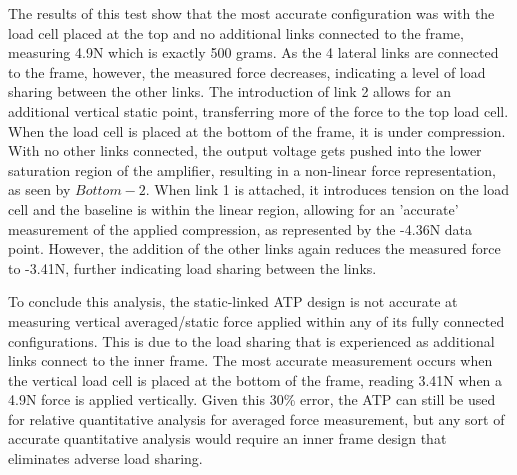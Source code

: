 The results of this test show that the most accurate configuration was with the load cell placed at the top and no additional links connected to the frame, measuring 4.9N which is exactly 500 grams. As the 4 lateral links are connected to the frame, however, the measured force decreases, indicating a level of load sharing between the other links. The introduction of link 2 allows for an additional vertical static point, transferring more of the force to the top load cell. When the load cell is placed at the bottom of the frame, it is under compression. With no other links connected, the output voltage gets pushed into the lower saturation region of the amplifier, resulting in a non-linear force representation, as seen by $Bottom-2$. When link 1 is attached, it introduces tension on the load cell and the baseline is within the linear region, allowing for an 'accurate' measurement of the applied compression, as represented by the -4.36N data point. However, the addition of the other links again reduces the measured force to -3.41N, further indicating load sharing between the links.

To conclude this analysis, the static-linked ATP design is not accurate at measuring vertical averaged/static force applied within any of its fully connected configurations. This is due to the load sharing that is experienced as additional links connect to the inner frame. The most accurate measurement occurs when the vertical load cell is placed at the bottom of the frame, reading 3.41N when a 4.9N force is applied vertically. Given this 30\% error, the ATP can still be used for relative quantitative analysis for averaged force measurement, but any sort of accurate quantitative analysis would require an inner frame design that eliminates adverse load sharing.

